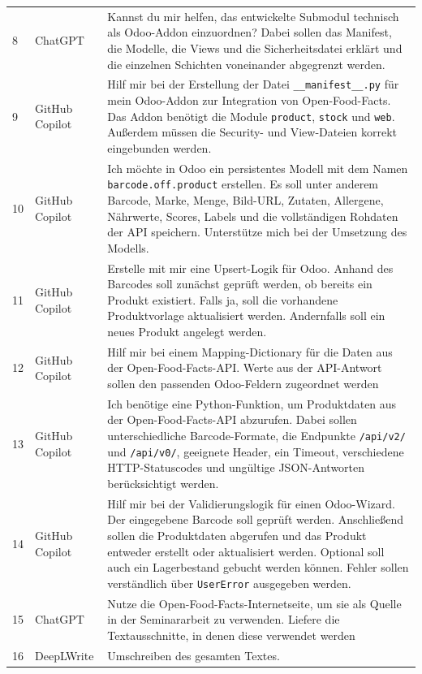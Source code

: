 \documentclass[12pt,a4paper]{article}
\begin{document}
\begin{longtable}{
    @{}
    p{0.9cm}
    p{3.2cm}
    >{\RaggedRight\arraybackslash}
    p{\dimexpr\textwidth-5.0cm\relax}
    @{}
}
8 & ChatGPT & Kannst du mir helfen, das entwickelte Submodul technisch als Odoo-Addon einzuordnen? Dabei sollen das Manifest, die Modelle, die Views und die Sicherheitsdatei erklärt und die einzelnen Schichten voneinander abgegrenzt werden. \\


9 & GitHub Copilot & Hilf mir bei der Erstellung der Datei \texttt{\_\_manifest\_\_.py} für mein Odoo-Addon zur Integration von Open-Food-Facts. Das Addon benötigt die Module \texttt{product}, \texttt{stock} und \texttt{web}. Außerdem müssen die Security- und View-Dateien korrekt eingebunden werden. \\

10 & GitHub Copilot & Ich möchte in Odoo ein persistentes Modell mit dem Namen \texttt{barcode.off.product} erstellen. Es soll unter anderem Barcode, Marke, Menge, Bild-URL, Zutaten, Allergene, Nährwerte, Scores, Labels und die vollständigen Rohdaten der API speichern. Unterstütze mich bei der Umsetzung des Modells. \\

11 & GitHub Copilot & Erstelle mit mir eine Upsert-Logik für Odoo. Anhand des Barcodes soll zunächst geprüft werden, ob bereits ein Produkt existiert. Falls ja, soll die vorhandene Produktvorlage aktualisiert werden. Andernfalls soll ein neues Produkt angelegt werden. \\

12 & GitHub Copilot & Hilf mir bei einem Mapping-Dictionary für die Daten aus der Open-Food-Facts-API. Werte aus der API-Antwort sollen den passenden Odoo-Feldern zugeordnet werden \\

13 & GitHub Copilot & Ich benötige eine Python-Funktion, um Produktdaten aus der Open-Food-Facts-API abzurufen. Dabei sollen unterschiedliche Barcode-Formate, die Endpunkte \texttt{/api/v2/} und \texttt{/api/v0/}, geeignete Header, ein Timeout, verschiedene HTTP-Statuscodes und ungültige JSON-Antworten berücksichtigt werden. \\

14 & GitHub Copilot & Hilf mir bei der Validierungslogik für einen Odoo-Wizard. Der eingegebene Barcode soll geprüft werden. Anschließend sollen die Produktdaten abgerufen und das Produkt entweder erstellt oder aktualisiert werden. Optional soll auch ein Lagerbestand gebucht werden können. Fehler sollen verständlich über \texttt{UserError} ausgegeben werden. \\

15 & ChatGPT & Nutze die Open-Food-Facts-Internetseite, um sie als Quelle in der Seminararbeit zu verwenden. Liefere die Textausschnitte, in denen diese verwendet werden \\

16 & DeepLWrite & Umschreiben des gesamten Textes. \\
\bottomrule
\end{longtable}
\end{document}
